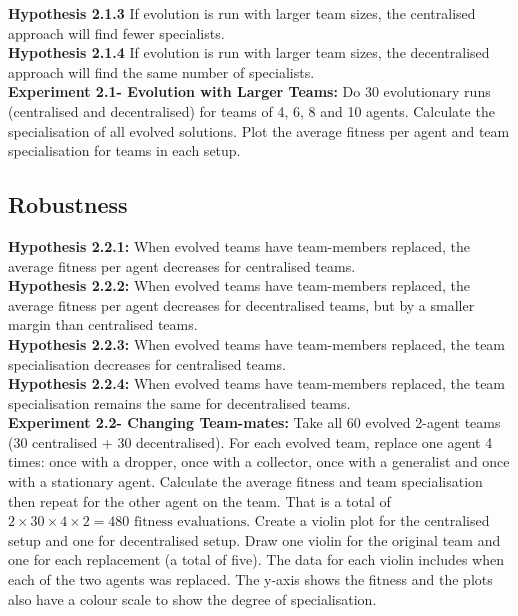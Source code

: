 \documentclass[12pt]{article}
\begin{document}
\textbf{Hypothesis 2.1.3} If evolution is run with larger team sizes, the centralised approach will find fewer specialists.\\

\textbf{Hypothesis 2.1.4} If evolution is run with larger team sizes, the decentralised approach will find the same number of specialists.\\

\textbf{Experiment 2.1- Evolution with Larger Teams:} Do 30 evolutionary runs (centralised and decentralised) for teams of 4, 6, 8 and 10 agents.
Calculate the specialisation of all evolved solutions.
Plot the average fitness per agent and team specialisation for teams in each setup. \\

\subsection{Robustness}

\textbf{Hypothesis 2.2.1:} When evolved teams have team-members replaced, the average fitness per agent decreases for centralised teams.\\

\textbf{Hypothesis 2.2.2:} When evolved teams have team-members replaced, the average fitness per agent decreases for decentralised teams, but by a smaller margin than centralised teams.\\

\textbf{Hypothesis 2.2.3:} When evolved teams have team-members replaced, the team specialisation decreases for centralised teams.\\

\textbf{Hypothesis 2.2.4:} When evolved teams have team-members replaced, the team specialisation remains the same for decentralised teams.\\

\textbf{Experiment 2.2- Changing Team-mates:} Take all 60 evolved 2-agent teams (30 centralised + 30 decentralised).
For each evolved team, replace one agent 4 times: once with a dropper, once with a collector, once with a generalist and once with a stationary agent.
Calculate the average fitness and team specialisation then repeat for the other agent on the team.
That is a total of $2 \times 30 \times 4 \times 2= 480 \mbox{ fitness evaluations}$. 
Create a violin plot for the centralised setup and one for decentralised setup.
Draw one violin for the original team and one for each replacement (a total of five).
The data for each violin includes when each of the two agents was replaced.
The y-axis shows the fitness and the plots also have a colour scale to show the degree of specialisation.\\
\end{document}
